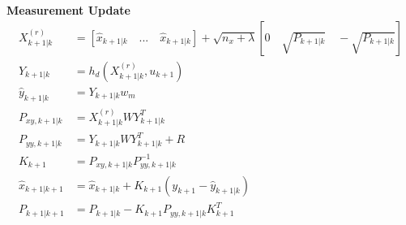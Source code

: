 \documentclass[12pt,a4paper]{article}
\begin{document}
	\textbf{Measurement Update}
	\begin{equation}
		\begin{split}
			X^{(r)}_{k+1|k} &= [\hat{x}_{k+1|k}\quad ...\quad \hat{x}_{k+1|k}]+\sqrt{n_x + \lambda}[0\quad \sqrt{P_{k+1|k}}\quad -\sqrt{P_{k+1|k}}]\\
			Y_{k+1|k} &= h_d(X^{(r)}_{k+1|k},u_{k+1})\\
			\hat{y}_{k+1|k} &= Y_{k+1|k} w_m\\
			P_{xy,k+1|k} &= X^{(r)}_{k+1|k}WY^T_{k+1|k}\\
			P_{yy,k+1|k} &= Y_{k+1|k}WY^T_{k+1|k} + R \\
			K_{k+1} &= P_{xy,k+1|k}P^{-1}_{yy,k+1|k}\\
			\hat{x}_{k+1|k+1} &= \hat{x}_{k+1|k} + K_{k+1}(y_{k+1}-\hat{y}_{k+1|k})\\
			P_{k+1|k+1} &= P_{k+1|k} - K_{k+1}P_{yy,k+1|k}K^T_{k+1}
		\end{split}
		\label{eq11}
	\end{equation}
\end{document}
